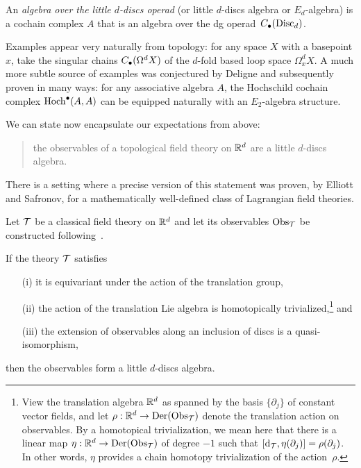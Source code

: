 \documentclass[11pt]{amsart}
\begin{document}
\begin{dfn}
An {\em algebra over the little $d$-discs operad} (or little $d$-discs algebra or $E_d$-algebra) is a cochain complex $A$ that is an algebra over the dg operad~$C_\bullet({\rm Disc}_d)$.
\end{dfn}

Examples appear very naturally from topology: for any space $X$ with a basepoint $x$, take the singular chains $C_\bullet(\Omega^d X)$ of the $d$-fold based loop space $\Omega^d_x X$.
A much more subtle source of examples was conjectured by Deligne and subsequently proven in many ways: 
for any associative algebra $A$, the Hochschild cochain complex ${\rm Hoch}^\bullet(A,A)$ can be equipped naturally with an $E_2$-algebra structure.

We can state now encapsulate our expectations from above:
\begin{quote}
the observables of a topological field theory on $\mathbb R^d$ are a little $d$-discs algebra.
\end{quote}
There is a setting where a precise version of this statement was proven, by Elliott and Safronov, for a mathematically well-defined class of Lagrangian field theories.

\begin{thm}
\label{thm: EllSaf}
Let $\mathcal T$ be a classical field theory on $\mathbb R^d$
and let its observables ${\rm Obs}_\mathcal T$ be constructed following~\cite{CG2}.

If the theory $\mathcal T$ satisfies 
\begin{enumerate}
\item[(i)] it is equivariant under the action of the translation group,
\item[(ii)] the action of the translation Lie algebra is homotopically trivialized,\footnote{View the translation algebra $\mathbb R^d$ as spanned by the basis $\{\partial_j\}$ of constant vector fields, and let $\rho: \mathbb R^d \to {\rm Der}({\rm Obs}_\mathcal T)$ denote the translation action on observables.
By a homotopical trivialization, we mean here that there is a linear map $\eta: \mathbb R^d \to {\rm Der}({\rm Obs}_\mathcal T)$ of degree $-1$ such that $[{\rm d}_{\mathcal T}, \eta(\partial_j)] = \rho(\partial_j)$.
In other words, $\eta$ provides a chain homotopy trivialization of the action~$\rho$.} 
and
\item[(iii)] the extension of observables along an inclusion of discs is a quasi-isomorphism,
\end{enumerate}
then the observables form a little $d$-discs algebra.
\end{thm}
\end{document}

